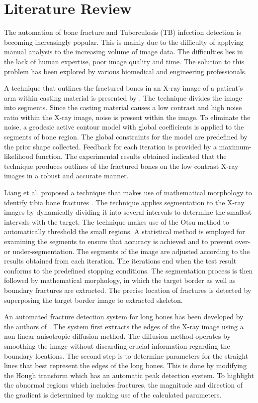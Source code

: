 \documentclass[11pt]{article}
\begin{document}
	\section{Literature Review}
	\label{sc: Literature Review}
	The automation of bone fracture and Tuberculosis (TB) infection detection is becoming increasingly popular. This is mainly due to the difficulty of applying manual analysis to the increasing volume of image data. The difficulties lies in the lack of human expertise, poor image quality and time. The solution to this problem has been explored by various biomedical and engineering professionals. 
	
	A technique that outlines the fractured bones in an X-ray image of a patient's arm within casting material is presented by \cite{Jia_Jiang2006}. The technique divides the image into segments. Since the casting material causes a low contrast and high noise ratio within the X-ray image, noise is present within the image. To eliminate the noise, a geodesic active contour model with global coefficients is applied to the segments of bone region. The global constraints for the model are predefined by the prior shape collected. Feedback for each iteration is provided by a maximum-likelihood function. The experimental results obtained indicated that the technique produces outlines of the fractured bones on the low contrast X-ray images in a robust and accurate manner.
	
	Liang et al. proposed a technique that makes use of mathematical morphology to identify tibia bone fractures \cite{Liang_Pan_Huang_Fan_2010}. The technique applies segmentation to the X-ray images by dynamically dividing it into several intervals to determine the smallest intervals with the target. The technique makes use of the Otsu method to automatically threshold the small regions. A statistical method is employed for examining the segments to ensure that accuracy is achieved and to prevent over- or under-segmentation. The segments of the image are adjusted according to the results obtained from each iteration. The iterations end when the test result conforms to the predefined stopping conditions. The segmentation process is then followed by mathematical morphology, in which the target border as well as boundary fractures are extracted. The precise location of fractures is detected by superposing the target border image to extracted skeleton.
	
	An automated fracture detection system for long bones has been developed by the authors of \cite{Donnelley2005}. The system first extracts the edges of the X-ray image using a non-linear anisotropic diffusion method. The diffusion method operates by smoothing the image without discarding crucial information regarding the boundary locations. The second step is to determine parameters for the straight lines that best represent the edges of the long bones. This is done by modifying the Hough transform which has an automatic peak detection system. To highlight the abnormal regions which includes fractures, the magnitude and direction of the gradient is determined by making use of the calculated parameters.
	
\end{document}
